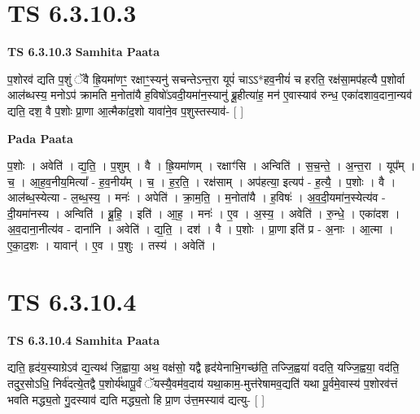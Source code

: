 \documentclass[17pt]{extarticle}
\begin{document}

\section{ TS 6.3.10.3 }

\textbf{TS 6.3.10.3 } \newline
\textbf{Samhita Paata} \newline

प॒शोरव॑ द्यति प॒शुं ॅवै ह्रि॒यमा॑णꣳ॒॒ रक्षाꣳ॒॒स्यनु॑ सचन्तेऽन्त॒रा यूपं॑ चाऽऽ*हव॒नीयं॑ च हरति॒ रक्ष॑सा॒मप॑हत्यै प॒शोर्वा आल॑ब्धस्य॒ मनोऽप॑ क्रामति म॒नोता॑यै ह॒विषो॑ऽवदी॒यमा॑न॒स्यानु॑ ब्रू॒हीत्या॑ह॒ मन॑ ए॒वास्याव॑ रुन्ध॒ एका॑दशाव॒दाना॒न्यव॑ द्यति॒ दश॒ वै प॒शोः प्रा॒णा आ॒त्मैका॑द॒शो यावा॑ने॒व प॒शुस्तस्याव॑- [  ] \newline

\textbf{Pada Paata} \newline

प॒शोः । अवेति॑ । द्य॒ति॒ । प॒शुम् । वै । ह्रि॒यमा॑णम् । रक्षाꣳ॑सि । अन्विति॑ । स॒च॒न्ते॒ । अ॒न्त॒रा । यूप᳚म् । च॒ । आ॒ह॒व॒नीय॒मित्या᳚ - ह॒व॒नीय᳚म् । च॒ । ह॒र॒ति॒ । रक्ष॑साम् । अप॑हत्या॒ इत्यप॑ - ह॒त्यै॒ । प॒शोः । वै । आल॑ब्ध॒स्येत्या - ल॒ब्ध॒स्य॒ । मनः॑ । अपेति॑ । क्रा॒म॒ति॒ । म॒नोता॑यै । ह॒विषः॑ । अ॒व॒दी॒यमा॑न॒स्येत्य॑व - दी॒यमा॑नस्य । अन्विति॑ । ब्रू॒हि॒ । इति॑ । आ॒ह॒ । मनः॑ । ए॒व । अ॒स्य॒ । अवेति॑ । रु॒न्धे॒ । एका॑दश । अ॒व॒दाना॒नीत्य॑व - दाना॑नि । अवेति॑ । द्य॒ति॒ । दश॑ । वै । प॒शोः । प्रा॒णा इति॑ प्र - अ॒नाः । आ॒त्मा । ए॒का॒द॒शः । यावान्॑ । ए॒व । प॒शुः । तस्य॑ । अवेति॑ ।  \newline





\section{ TS 6.3.10.4 }

\textbf{TS 6.3.10.4 } \newline
\textbf{Samhita Paata} \newline

द्यति॒ हृद॑य॒स्याग्रेऽव॑ द्य॒त्यथ॑ जि॒ह्वाया॒ अथ॒ वक्ष॑सो॒ यद्वै हृद॑येनाभि॒गच्छ॑ति॒ तज्जि॒ह्वया॑ वदति॒ यज्जि॒ह्वया॒ वद॑ति॒ तदुर॒सोऽधि॒ निर्व॑दत्ये॒तद्वै प॒शोर्य॑थापू॒र्वं ॅयस्यै॒वम॑व॒दाय॑ यथा॒काम॒-मुत्त॑रेषामव॒द्यति॑ यथा पू॒र्वमे॒वास्य॑ प॒शोरव॑त्तं भवति मद्ध्य॒तो गु॒दस्याव॑ द्यति मद्ध्य॒तो हि प्रा॒ण उ॑त्त॒मस्याव॑ द्यत्यु- [  ] \newline
\end{document}
